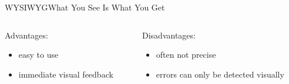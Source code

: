 \documentclass{setbeamer}
\begin{document}
\begin{frame}{WYSIWYG}{What You See Is What You Get}
    \vspace{5mm}
    \begin{columns}
        \begin{column}{0.45\textwidth}
            Advantages:
            \begin{itemize}
                \item easy to use
                \item immediate visual feedback
            \end{itemize}
        \end{column}

        \begin{column}{0.5\textwidth}
            Disadvantages:
            \begin{itemize}
                \item often not precise
                \item errors can only be detected visually
            \end{itemize}
        \end{column}
    \end{columns}
\end{frame}
\end{document}
